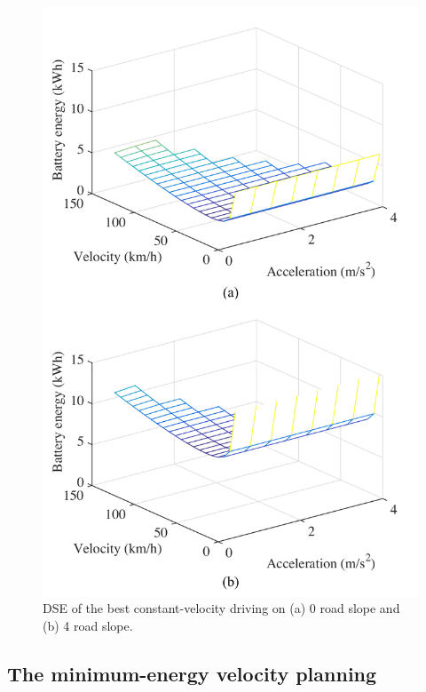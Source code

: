 \documentclass{IEEEtran}
\begin{document}
\begin{figure} %
\centering
\includegraphics[width=0.95\hsize]{Figures/Design_space_exploration.pdf}
\caption{DSE of the best constant-velocity driving on (a) 0 road slope and (b) 4 road slope.}
\label{fig:DSE}
\end{figure} 

\subsection{The minimum-energy velocity planning} \label{subsec:variable drive}
\end{document}
